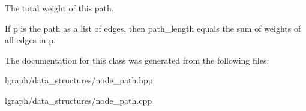 The total weight of this path. 

If \textquotesingle{}p\textquotesingle{} is the path as a list of edges, then \textquotesingle{}path\+\_\+length\textquotesingle{} equals the sum of weights of all edges in \textquotesingle{}p\textquotesingle{}. 

The documentation for this class was generated from the following files\+:\begin{DoxyCompactItemize}
\item 
lgraph/data\+\_\+structures/node\+\_\+path.\+hpp\item 
lgraph/data\+\_\+structures/node\+\_\+path.\+cpp\end{DoxyCompactItemize}
